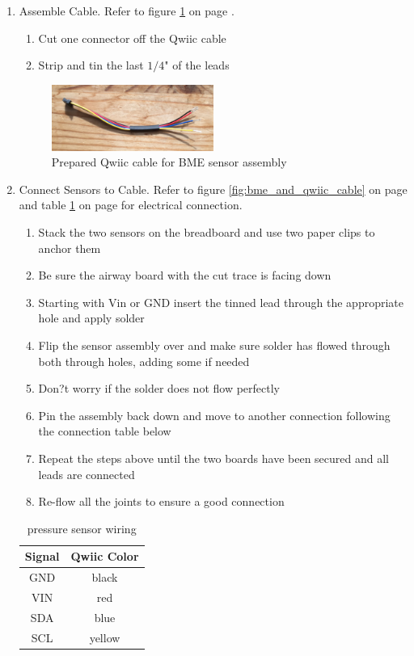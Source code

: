 \documentclass[11pt, letterpaper]{article}
\begin{document}
\begin{enumerate}
\begin{enumerate}[label=3.\arabic*]
\item
Assemble Cable. Refer to figure \ref{fig:bme_qwiic_cable} on page \pageref{fig:bme_qwiic_cable}.
\begin{enumerate}[label=3.3.\arabic*]
\item
Cut one connector off the Qwiic cable
\item
Strip and tin the last $1/4$" of the leads 
\end{enumerate}
\begin{figure}[H]
\centering
\includegraphics[width=0.5\textwidth]{images/bme_qwiic_cable.JPG}
\caption{Prepared Qwiic cable for BME sensor assembly} 
\label{fig:bme_qwiic_cable}
\end{figure}
\item
Connect Sensors to Cable. Refer to figure \ref{fig:bme_and_qwiic_cable} on page \pageref{fig:bme_and_qwiic_cable} and table \ref{tab:pressure} on page \pageref{tab:pressure} for electrical connection.
\begin{enumerate}[label=3.4.\arabic*]
\item
Stack the two sensors on the breadboard and use two paper clips to anchor them
\item
Be sure the airway board with the cut trace is facing down
\item
Starting with Vin or GND insert the tinned lead through the appropriate hole and apply solder
\item
Flip the sensor assembly over and make sure solder has flowed through both through holes, adding some if needed
\item
Don?t worry if the solder does not flow perfectly
\item
Pin the assembly back down and move to another connection following the connection table below
\item
Repeat the steps above until the two boards have been secured and all leads are connected
\item
Re-flow all the joints to ensure a good connection
\end{enumerate}

\begin{table}[H]
\centering
\begin{tabular}{| c | c |}
\hline
Signal & Qwiic Color\\  \hline
GND & black  \\  \hline
VIN & red \\  \hline
SDA & blue \\  \hline
SCL & yellow \\  
\hline
\end{tabular}
\caption{pressure sensor wiring}
\label{tab:pressure}
\end{table}


\end{enumerate}
\end{enumerate}
\end{document}
